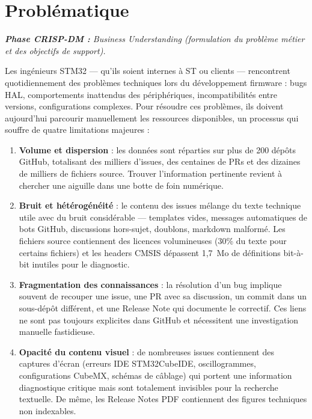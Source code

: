 \documentclass[12pt,a4paper]{report}
\begin{document}
\section{Problématique}
\label{sec:problematique}

\textit{\small\textbf{\textcolor{stblue}{Phase CRISP-DM :}} Business Understanding (formulation du problème métier et des objectifs de support).}\par\smallskip

Les ingénieurs STM32 --- qu'ils soient internes à ST ou clients --- rencontrent quotidiennement des problèmes techniques lors du développement firmware : bugs HAL, comportements inattendus des périphériques, incompatibilités entre versions, configurations complexes. Pour résoudre ces problèmes, ils doivent aujourd'hui parcourir manuellement les ressources disponibles, un processus qui souffre de quatre limitations majeures :

\begin{enumerate}
  \item \textbf{Volume et dispersion} : les données sont réparties sur plus de 200 dépôts GitHub, totalisant des milliers d'issues, des centaines de PRs et des dizaines de milliers de fichiers source. Trouver l'information pertinente revient à chercher une aiguille dans une botte de foin numérique.
  
  \item \textbf{Bruit et hétérogénéité} : le contenu des issues mélange du texte technique utile avec du bruit considérable --- templates vides, messages automatiques de bots GitHub, discussions hors-sujet, doublons, markdown malformé. Les fichiers source contiennent des licences volumineuses (30\% du texte pour certains fichiers) et les headers CMSIS dépassent 1,7~Mo de définitions bit-à-bit inutiles pour le diagnostic.
  
  \item \textbf{Fragmentation des connaissances} : la résolution d'un bug implique souvent de recouper une issue, une PR avec sa discussion, un commit dans un sous-dépôt différent, et une Release Note qui documente le correctif. Ces liens ne sont pas toujours explicites dans GitHub et nécessitent une investigation manuelle fastidieuse.
  
  \item \textbf{Opacité du contenu visuel} : de nombreuses issues contiennent des captures d'écran (erreurs IDE STM32CubeIDE, oscillogrammes, configurations CubeMX, schémas de câblage) qui portent une information diagnostique critique mais sont totalement invisibles pour la recherche textuelle. De même, les Release Notes PDF contiennent des figures techniques non indexables.
\end{enumerate}
\end{document}
